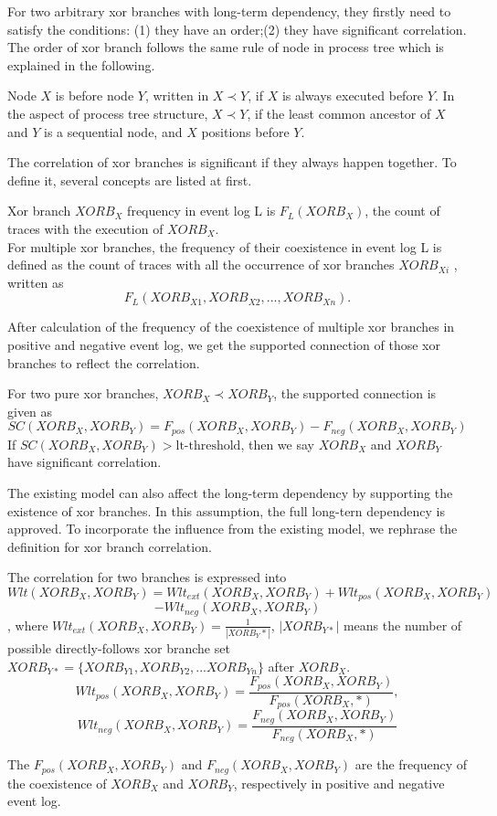 For two arbitrary xor branches with long-term dependency, they firstly need to satisfy the conditions: (1) they have an order;(2) they have significant correlation.
The order of xor branch follows the same rule of node in process tree which is explained in the following.
\begin{definition}
	Node $X$ is before node $Y$, written in $X \prec Y$, if $X$ is always executed before $Y$.  In the aspect of process tree structure, $X \prec Y$, if the least common ancestor of $X$ and $Y$ is a sequential node, and $X$ positions before $Y$.
\end{definition} 

The correlation of xor branches is significant if they always happen together. To define it, several concepts are listed at first. 
\begin{definition}
	Xor branch $XORB_X$ frequency in event log L is $F_{L}(XORB_X)$, the count of traces with the execution of $XORB_X$. \\
	For multiple xor branches, the frequency of their coexistence in event log L is defined as the count of traces with all the occurrence of xor branches $XORB_{Xi}$ , written as \[F_{L}(XORB_{X1}, XORB_{X2},...,XORB_{Xn}).\]
\end{definition}
After calculation of the frequency of the coexistence of multiple xor branches in positive and negative event log, we get the supported connection of those xor branches to reflect the correlation. 
\begin{definition}
	\label{def: supported-connection}
	For two pure xor branches, $XORB_X \prec XORB_Y$, the supported connection is given as \[SC(XORB_X,XORB_Y)= F_{pos}(XORB_X, XORB_Y) -F_{neg}(XORB_X, XORB_Y)\]If $SC(XORB_X,XORB_Y) > \text{lt-threshold}$, then we say $XORB_X$ and $XORB_Y$ have significant correlation.
\end{definition}
The existing model can also affect the long-term dependency by supporting the existence of xor branches. In this assumption, the full long-tern dependency is approved. To incorporate the influence from the existing model, we rephrase the definition for xor branch correlation.
\begin{definition} The correlation for two branches is expressed into
	\[Wlt(XORB_X,XORB_Y)= Wlt_{ext}(XORB_X, XORB_Y) + Wlt_{pos}(XORB_X, XORB_Y)\] \[ -Wlt_{neg}(XORB_X, XORB_Y)\], where 
	$Wlt_{ext}(XORB_X, XORB_Y)= \frac{1}{|XORB_Y*|}$, $|XORB_{Y*}|$ means the number of possible  directly-follows xor branche set $XORB_{Y*}=\{XORB_{Y1}, XORB_{Y2},...XORB_{Yn} \}$ after $XORB_X$. 
	\[Wlt_{pos}(XORB_X, XORB_Y)= \frac{F_{pos}(XORB_X, XORB_Y)}{F_{pos}(XORB_X, *)},\]
	\[Wlt_{neg}(XORB_X, XORB_Y)= \frac{F_{neg}(XORB_X, XORB_Y)}{F_{neg}(XORB_X, *)}\]	
\end{definition}
The $F_{pos}(XORB_X, XORB_Y)$ and $F_{neg}(XORB_X, XORB_Y)$ are the frequency of the coexistence of $XORB_X$ and $XORB_Y$, respectively in positive and negative event log.

